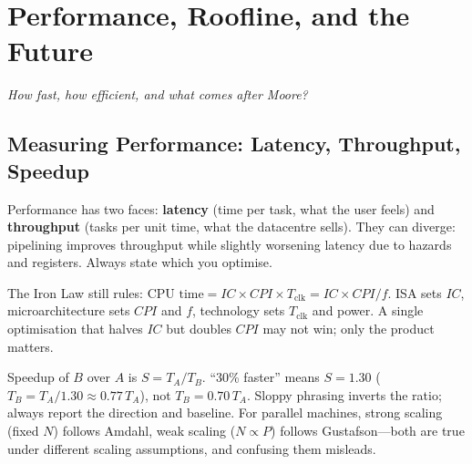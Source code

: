 \chapter{Performance, Roofline, and the Future}\label{ch:performance}
\begin{center}\small\textit{How fast, how efficient, and what comes after Moore?}\end{center}

\section{Measuring Performance: Latency, Throughput, Speedup}
Performance has two faces: \textbf{latency} (time per task, what the user feels) and
\textbf{throughput} (tasks per unit time, what the datacentre sells). They can diverge:
pipelining improves throughput while slightly worsening latency due to hazards and
registers. Always state which you optimise.

The Iron Law still rules: $\text{CPU time}=IC\times CPI\times T_{\text{clk}}=IC\times
CPI/f$. ISA sets $IC$, microarchitecture sets $CPI$ and $f$, technology sets
$T_{\text{clk}}$ and power. A single optimisation that halves $IC$ but doubles $CPI$ may
not win; only the product matters.

Speedup of $B$ over $A$ is $S=T_A/T_B$. ``30\% faster'' means $S=1.30$
($T_B=T_A/1.30\approx0.77\,T_A$), not $T_B=0.70\,T_A$. Sloppy phrasing inverts the
ratio; always report the direction and baseline. For parallel machines, strong scaling
(fixed $N$) follows Amdahl, weak scaling ($N\propto P$) follows Gustafson---both are
true under different scaling assumptions, and confusing them misleads.

\begin{center}
\end{center}

